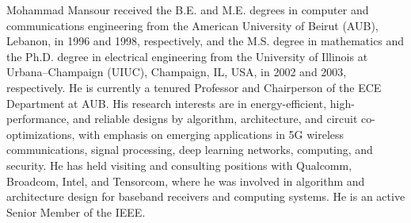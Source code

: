 \documentclass[journal]{IEEEtran}
\begin{document}
\begin{IEEEbiographynophoto}{Mohammad Mansour}
received the B.E. and M.E. degrees in computer and communications engineering from the American University of Beirut (AUB), Lebanon, in 1996 and 1998, respectively, and the M.S. degree in mathematics and the Ph.D. degree in electrical engineering from the University of Illinois at Urbana–Champaign (UIUC), Champaign, IL, USA, in 2002 and 2003, respectively. He is currently a tenured Professor and Chairperson of the ECE Department at AUB. His research interests are in energy-efficient, high-performance, and reliable designs by algorithm, architecture, and circuit co-optimizations, with emphasis on emerging applications in 5G wireless communications, signal processing, deep learning networks, computing, and security. He has held visiting and consulting positions with Qualcomm, Broadcom, Intel, and Tensorcom, where he was involved in algorithm and architecture design for baseband receivers and computing systems. He is an active Senior Member of the IEEE.
\end{IEEEbiographynophoto}









\end{document}

